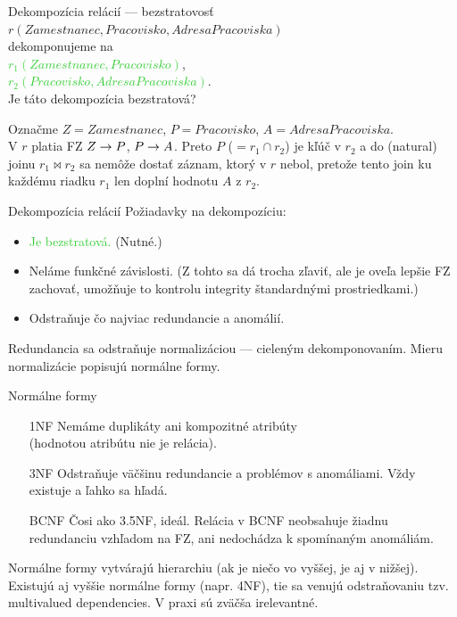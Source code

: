 \documentclass[12pt]{beamer}
\def\blue#1{\textcolor{Cerulean}{#1}}
\def\green#1{\textcolor{LimeGreen}{#1}}
\begin{document}
\begin{frame}[fragile]{Dekompozícia relácií --- bezstratovosť}
\blue{$r(Zamestnanec, Pracovisko, AdresaPracoviska)$}\\
dekomponujeme na\\
\green{$r_1(Zamestnanec, Pracovisko)$},\\
\green{$r_2(Pracovisko, AdresaPracoviska)$}.\\
Je táto dekompozícia bezstratová?
\pause

\bigskip
Označme $Z = Zamestnanec$, $P = Pracovisko$, $A = AdresaPracoviska$.\\[2mm]
V $r$ platia FZ $Z\rightarrow P$, $P\rightarrow A$. Preto $P$ ($= r_1\cap r_2$) je kľúč v $r_2$ a do (natural) joinu $r_1\bowtie r_2$
sa nemôže dostať záznam, ktorý v $r$ nebol, pretože tento join ku každému riadku $r_1$ len doplní hodnotu $A$ z $r_2$.
\end{frame}

\begin{frame}[fragile]{Dekompozícia relácií}
Požiadavky na dekompozíciu:
\begin{itemize}
\item \green{Je bezstratová.} (Nutné.)
\item \blue{Neláme funkčné závislosti.} (Z tohto sa dá trocha zľaviť,
            ale je oveľa lepšie FZ zachovať, umožňuje to kontrolu integrity štandardnými prostriedkami.)
\item \alert{Odstraňuje čo najviac redundancie a anomálií.}
\end{itemize}
Redundancia sa odstraňuje \alert{normalizáciou} --- cieleným dekomponovaním.
Mieru normalizácie popisujú \alert{normálne formy}.
\end{frame}

\begin{frame}[fragile]{Normálne formy}
\begin{itemize}
\item[\alert{1NF}] Nemáme duplikáty ani kompozitné atribúty\\ (hodnotou atribútu nie je relácia).
\item[\alert{3NF}] Odstraňuje väčšinu redundancie a problémov s anomáliami. Vždy existuje a ľahko sa hľadá.
\item[\alert{BCNF}] Čosi ako 3.5NF, ideál. Relácia v BCNF neobsahuje žiadnu redundanciu vzhľadom na FZ, ani nedochádza k spomínaným anomáliám.
\end{itemize}
Normálne formy vytvárajú hierarchiu (ak je niečo vo vyššej, je aj v nižšej).
Existujú aj vyššie normálne formy (napr. 4NF), tie sa venujú odstraňovaniu tzv. multivalued dependencies.
V praxi sú zväčša irelevantné.
\end{frame}
\end{document}
